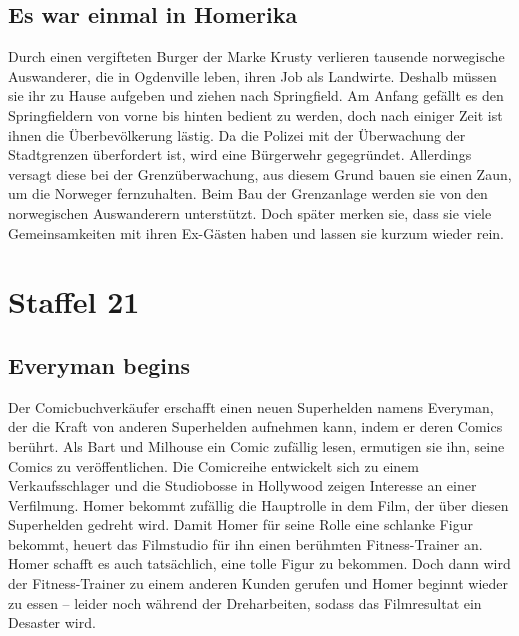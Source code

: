 \subsection{Es war einmal in Homerika}
Durch einen vergifteten Burger der Marke Krusty verlieren tausende norwegische Auswanderer, die in Ogdenville leben, ihren Job als Landwirte. Deshalb müssen sie ihr zu Hause aufgeben und ziehen nach Springfield. Am Anfang gefällt es den Springfieldern von vorne bis hinten bedient zu werden, doch nach einiger Zeit ist ihnen die Überbevölkerung lästig. Da die Polizei mit der Überwachung der Stadtgrenzen überfordert ist, wird eine Bürgerwehr gegegründet. Allerdings versagt diese bei der Grenzüberwachung, aus diesem Grund bauen sie einen Zaun, um die Norweger fernzuhalten. Beim Bau der Grenzanlage werden sie von den norwegischen Auswanderern unterstützt. Doch später merken sie, dass sie viele Gemeinsamkeiten mit ihren Ex-Gästen haben und lassen sie kurzum wieder rein. 


\section{Staffel 21}

\subsection{Everyman begins}\label{LABF13}
Der Comicbuchverkäufer erschafft einen neuen Superhelden namens Everyman, der die Kraft von anderen Superhelden aufnehmen kann, indem er deren Comics berührt. Als Bart und Milhouse ein Comic zufällig lesen, ermutigen sie ihn, seine Comics zu veröffentlichen. Die Comicreihe entwickelt sich zu einem Verkaufsschlager und die Studiobosse in Hollywood zeigen Interesse an einer Verfilmung.  Homer bekommt zufällig die Hauptrolle in dem Film, der über diesen Superhelden gedreht wird. Damit Homer für seine Rolle eine schlanke Figur bekommt, heuert das Filmstudio für ihn einen berühmten Fitness-Trainer an. Homer schafft es auch tatsächlich, eine tolle Figur zu bekommen. Doch dann wird der Fitness-Trainer zu einem anderen Kunden gerufen und Homer beginnt wieder zu essen -- leider noch während der Dreharbeiten, sodass das Filmresultat ein Desaster wird.

